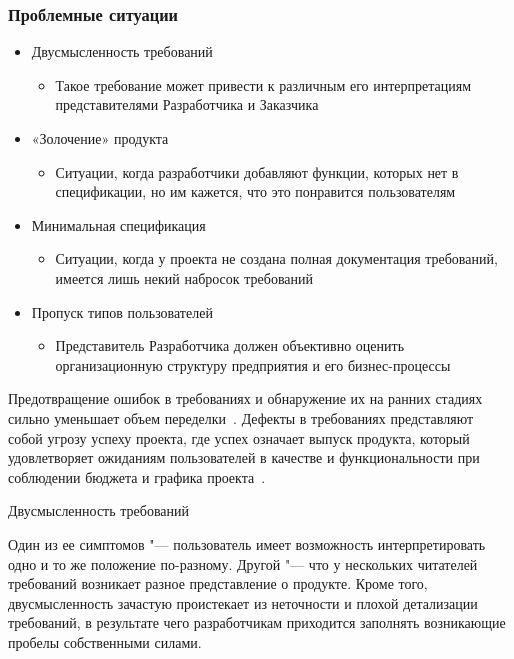 \documentclass{../industrial-development}
\begin{document}
{\begin{frame} \frametitle {Проблемные ситуации}
\begin{itemize}
\item \alert{Двусмысленность требований}
\begin{itemize}
\item Такое требование может привести к различным его интерпретациям представителями Разработчика и Заказчика
\end{itemize}
\item \alert{«Золочение» продукта}
\begin{itemize}
\item Ситуации, когда разработчики добавляют функции, которых нет в спецификации, но им кажется, что это понравится пользователям
\end{itemize}
\item \alert{Минимальная спецификация}
\begin{itemize}
\item Ситуации, когда у проекта не создана полная документация требований, имеется лишь некий набросок требований
\end{itemize}
\item \alert{Пропуск типов пользователей}
\begin{itemize}
\item Представитель Разработчика должен объективно оценить организационную структуру предприятия и его бизнес-процессы
\end{itemize}
\end{itemize}
\end{frame}

\lecturenotes

Предотвращение ошибок в требованиях и обнаружение их на ранних стадиях сильно уменьшает объем переделки~\cite[с.~16]{Wiegers}. Дефекты в требованиях представляют собой угрозу успеху проекта, где успех означает выпуск продукта, который удовлетворяет ожиданиям пользователей в качестве и функциональности при соблюдении бюджета и графика проекта~\cite[с.~17]{Wiegers}.

\alert{Двусмысленность требований}

Один из ее симптомов "--- пользователь имеет возможность интерпретировать одно и то же положение по-разному. Другой "--- что у нескольких читателей требований возникает разное представление о продукте. Кроме того, двусмысленность зачастую проистекает из неточности и плохой детализации требований, в результате чего разработчикам приходится заполнять возникающие пробелы собственными силами.

}
\end{document}
